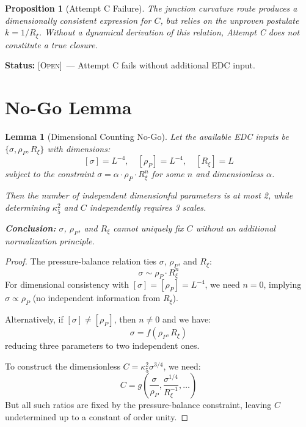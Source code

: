 \documentclass[11pt,a4paper]{article}
\newtheorem{proposition}{Proposition}
\newtheorem{lemma}{Lemma}
\theoremstyle{definition}
\newcommand{\Open}{\textsc{[Open]}}
\begin{document}
\begin{proposition}[Attempt C Failure]
The junction curvature route produces a dimensionally consistent expression for $C$,
but relies on the unproven postulate $k = 1/R_\xi$. Without a dynamical derivation
of this relation, Attempt C does not constitute a true closure.
\end{proposition}

\textbf{Status:} \Open\ --- Attempt C fails without additional EDC input.

\section{No-Go Lemma}
\label{sec:nogo}

\begin{lemma}[Dimensional Counting No-Go]
\label{lem:nogo}
Let the available EDC inputs be $\{\sigma, \rho_P, R_\xi\}$ with dimensions:
\[
[\sigma] = L^{-4}, \quad [\rho_P] = L^{-4}, \quad [R_\xi] = L
\]
subject to the constraint $\sigma = \alpha \cdot \rho_P \cdot R_\xi^n$ for some
$n$ and dimensionless $\alpha$.

Then the number of independent dimensionful parameters is at most 2, while
determining $\kappa_5^2$ and $C$ independently requires 3 scales.

\textbf{Conclusion:} $\sigma$, $\rho_P$, and $R_\xi$ cannot uniquely fix $C$
without an additional normalization principle.
\end{lemma}

\begin{proof}
The pressure-balance relation ties $\sigma$, $\rho_P$, and $R_\xi$:
\[
\sigma \sim \rho_P \cdot R_\xi^n
\]
For dimensional consistency with $[\sigma] = [\rho_P] = L^{-4}$, we need $n = 0$,
implying $\sigma \propto \rho_P$ (no independent information from $R_\xi$).

Alternatively, if $[\sigma] \neq [\rho_P]$, then $n \neq 0$ and we have:
\[
\sigma = f(\rho_P, R_\xi)
\]
reducing three parameters to two independent ones.

To construct the dimensionless $C = \kappa_5^2 \sigma^{3/4}$, we need:
\[
C = g\left(\frac{\sigma}{\rho_P}, \frac{\sigma^{1/4}}{R_\xi^{-1}}, \ldots\right)
\]
But all such ratios are fixed by the pressure-balance constraint, leaving $C$
undetermined up to a constant of order unity.
\end{proof}
\end{document}
